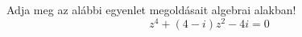 \documentclass[11pt]{scrartcl}
\begin{document}
Adja meg az alábbi egyenlet megoldásait algebrai alakban!
\[
	z^4 + (4 - i) z^2 - 4i = 0
\]
\end{document}
